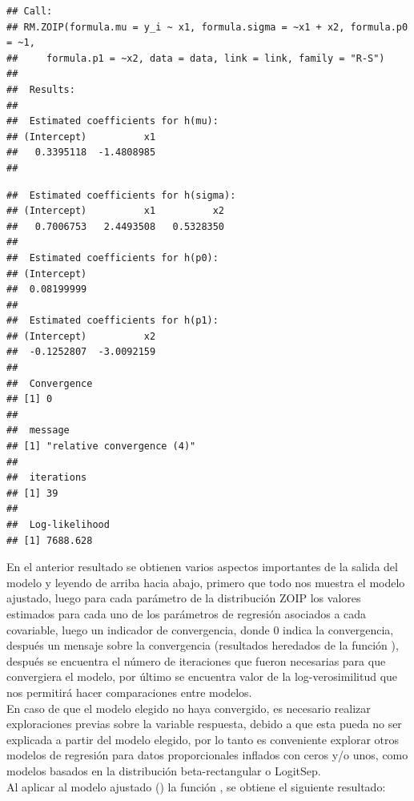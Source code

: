 \begin{verbatim}
## Call:
## RM.ZOIP(formula.mu = y_i ~ x1, formula.sigma = ~x1 + x2, formula.p0 = ~1, 
##     formula.p1 = ~x2, data = data, link = link, family = "R-S")
## 
##  Results: 
## 
##  Estimated coefficients for h(mu): 
## (Intercept)          x1 
##   0.3395118  -1.4808985 
## 
\end{verbatim}
\begin{verbatim}
##  Estimated coefficients for h(sigma): 
## (Intercept)          x1          x2 
##   0.7006753   2.4493508   0.5328350 
## 
##  Estimated coefficients for h(p0): 
## (Intercept) 
##  0.08199999 
## 
##  Estimated coefficients for h(p1): 
## (Intercept)          x2 
##  -0.1252807  -3.0092159 
## 
##  Convergence 
## [1] 0
## 
##  message 
## [1] "relative convergence (4)"
## 
##  iterations 
## [1] 39
## 
##  Log-likelihood 
## [1] 7688.628
\end{verbatim}

En el anterior resultado se obtienen varios aspectos importantes de la salida del modelo y leyendo de arriba hacia abajo, primero que todo nos muestra el modelo ajustado, luego para cada par\'{a}metro de la distribuci\'{o}n ZOIP los valores estimados para cada uno de los pa\-r\'{a}\-me\-tros de regresi\'{o}n asociados a cada covariable, luego un indicador de convergencia, donde 0 indica la convergencia, despu\'{e}s un mensaje sobre la convergencia (resultados heredados de la funci\'{o}n ), despu\'{e}s se encuentra el n\'{u}mero de iteraciones que fueron necesarias para que convergiera el modelo, por \'{u}ltimo se encuentra valor de la log-verosimilitud que nos permitir\'{a} hacer comparaciones entre modelos.\\

En caso de que el modelo elegido no haya convergido, es necesario realizar exploraciones previas sobre la variable respuesta, debido a que esta pueda no ser explicada a partir del modelo elegido, por lo tanto es conveniente explorar otros modelos de regresi\'{o}n para datos proporcionales inflados con ceros y/o unos, como modelos basados en la distribuci\'{o}n beta-rectangular o LogitSep.\\ 

 Al aplicar al modelo ajustado () la funci\'{o}n , se obtiene el siguiente resultado:

